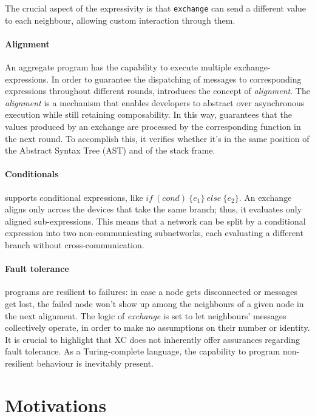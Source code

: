 The crucial aspect of the \xc{} expressivity is that \texttt{exchange} can send a different value to each neighbour,
allowing custom interaction through them.

\paragraph{Alignment}
An aggregate program has the capability to execute multiple exchange-expressions.
In order to guarantee the dispatching of messages to corresponding expressions throughout different rounds,
    \xc{} introduces the concept of \emph{alignment}.
The \emph{alignment} is a mechanism that enables developers to abstract over asynchronous execution while still retaining
composability.
In this way, \xc{} guarantees that the values produced by an exchange are processed by the corresponding function
in the next round.
To accomplish this, it verifies whether it's in the same position of the Abstract Syntax Tree (AST) and of the stack frame.

\paragraph{Conditionals}
\label{par:conditionals}
\xc{} supports conditional expressions, like $if\ (cond)\ \{e_1\}\ else\ \{e_2\}$.
An exchange aligns only across the devices that take the same branch; thus, it evaluates only aligned sub-expressions.
This means that a network can be split by a conditional expression into two non-communicating subnetworks, each
evaluating a different branch without cross-communication.

\paragraph{Fault tolerance}
\xc{} programs are resilient to failures: in case a node gets disconnected or messages get lost, the failed node won't
show up among the neighbours of a given node in the next alignment.
The logic of \emph{exchange} is set to let neighbours' messages collectively operate, in order to make no assumptions
on their number or identity.
It is crucial to highlight that XC does not inherently offer assurances regarding fault tolerance.
As a Turing-complete language, the capability to program non-resilient behaviour is inevitably present.

\section{Motivations}
\label{sec:motivations}

